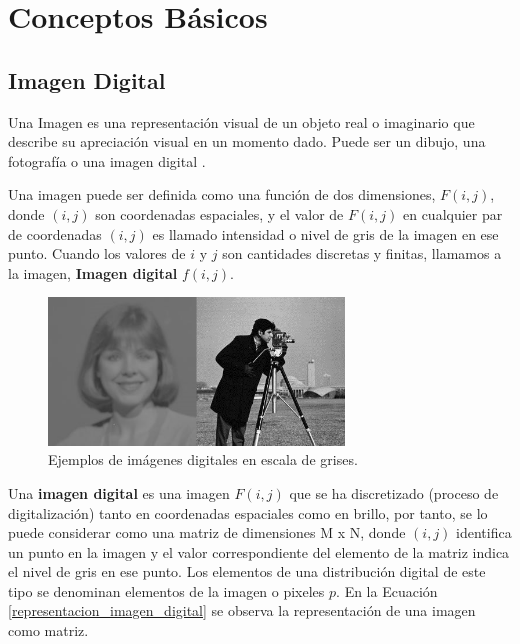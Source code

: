 \chapter{Conceptos Básicos}
\label{chap2}
\ifpdf
  \graphicspath{{Chapter2/Chapter2Figs/}}
\else
  \graphicspath{{Chapter2/Chapter2Figs/}}\fi


\section{Imagen Digital}

Una Imagen es una representación visual de un objeto real o imaginario que describe su apreciación visual en un momento dado. Puede ser un dibujo, una fotografía o una imagen digital \cite{russ2010}.

Una imagen puede ser definida como una función de dos dimensiones, $F(i,j)$, donde $(i,j)$ son coordenadas espaciales, y el valor de $F(i,j)$ en cualquier par de coordenadas $(i,j)$ es llamado intensidad o nivel de gris  de la imagen en ese punto. Cuando los valores de $i$ y $j$ son cantidades discretas y finitas, llamamos a la imagen, \textbf{Imagen digital} $f(i,j)$.

\begin{figure}[H]\centering
    \includegraphics[width=0.7\textwidth]{ej_img_digitales.jpg}
    \caption{Ejemplos de imágenes digitales en escala de grises.}
    \label{fg:img_digital}
\end{figure}

Una \textbf{imagen digital} es una imagen $F(i,j)$ que se ha discretizado (proceso de digitalización) tanto en coordenadas espaciales como en brillo, por tanto, se lo puede considerar como una matriz de dimensiones M x N, donde $(i,j)$ identifica un punto en la imagen y el valor correspondiente del elemento de la matriz indica el nivel de gris en ese punto. Los elementos de una distribución digital de este tipo se denominan elementos de la imagen o pixeles \textbf{$p$}. En la Ecuación \ref{representacion_imagen_digital} se observa la representación de una imagen como matriz.

